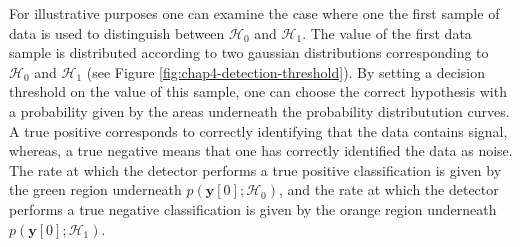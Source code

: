 For illustrative purposes one can examine the case where one the first sample of data is used to distinguish between $\mathcal{H}_0$ and $\mathcal{H}_1$. The value of the first data sample is distributed according to two gaussian distributions corresponding to $\mathcal{H}_0$ and $\mathcal{H}_1$ (see Figure \ref{fig:chap4-detection-threshold}). By setting a decision threshold on the value of this sample, one can choose the correct hypothesis with a probability given by the areas underneath the probability distributution curves. A true positive corresponds to correctly identifying that the data contains signal, whereas, a true negative means that one has correctly identified the data as noise. The rate at which the detector performs a true positive classification is given by the green region underneath $p(\bm{y}[0];\mathcal{H}_0)$, and the rate at which the detector performs a true negative classification is given by the orange region underneath $p(\bm{y}[0];\mathcal{H}_1)$.
